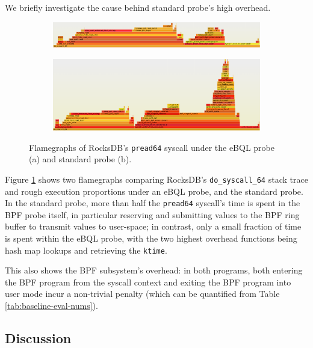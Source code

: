 We briefly investigate the cause behind standard probe's high overhead.

\begin{figure}
    \centering
    \begin{subfigure}{.8\textwidth}
        \centering
        \includegraphics[width=\linewidth]{diagrams/opt-pread-fg.png}
        \caption{}
    \end{subfigure}

    \begin{subfigure}{.8\textwidth}
        \centering
        \includegraphics[width=\linewidth]{diagrams/unopt-pread-fg.png}
        \caption{}
    \end{subfigure}
    \caption{Flamegraphs of RocksDB's \texttt{pread64} syscall under the eBQL probe (a) and standard
    probe (b).}
    \label{fig:pread-fgs}
\end{figure}

Figure \ref{fig:pread-fgs} shows two flamegraphs comparing RocksDB's \texttt{do\_syscall\_64} stack
trace and rough execution proportions under an eBQL probe, and the standard probe. In the standard
probe, more than half the \texttt{pread64} syscall's time is spent in the BPF probe itself, in
particular reserving and submitting values to the BPF ring buffer to transmit values to user-space;
in contrast, only a small fraction of time is spent within the eBQL probe, with the two highest
overhead functions being hash map lookups and retrieving the \texttt{ktime}.

This also shows the BPF subsystem's overhead: in both programs, both entering the BPF program from
the syscall context and exiting the BPF program into user mode incur a non-trivial penalty (which
can be quantified from Table \ref{tab:baseline-eval-nums}).

\subsection{Discussion}


